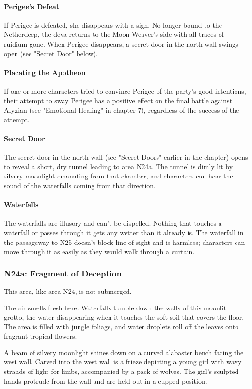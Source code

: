 \documentclass[10pt,a4paper,twoside,twocolumn,openany,nodeprecatedcode]{dndbook}
\begin{document}
\paragraph{Perigee's Defeat}
If Perigee is defeated, she disappears with a sigh. No longer bound to the Netherdeep, the deva returns to the Moon Weaver's side with all traces of ruidium gone. When Perigee disappears, a secret door in the north wall swings open (see "Secret Door" below).

\paragraph{Placating the Apotheon}
If one or more characters tried to convince Perigee of the party's good intentions, their attempt to sway Perigee has a positive effect on the final battle against Alyxian (see "Emotional Healing" in chapter 7), regardless of the success of the attempt.

\paragraph{Secret Door}
The secret door in the north wall (see "Secret Doors" earlier in the chapter) opens to reveal a short, dry tunnel leading to area N24a. The tunnel is dimly lit by silvery moonlight emanating from that chamber, and characters can hear the sound of the waterfalls coming from that direction.

\paragraph{Waterfalls}
The waterfalls are illusory and can't be dispelled. Nothing that touches a waterfall or passes through it gets any wetter than it already is. The waterfall in the passageway to N25 doesn't block line of sight and is harmless; characters can move through it as easily as they would walk through a curtain.

\subsubsection{N24a: Fragment of Deception}
This area, like area N24, is not submerged.

\begin{DndReadAloud}{}
The air smells fresh here. Waterfalls tumble down the walls of this moonlit grotto, the water disappearing when it touches the soft soil that covers the floor. The area is filled with jungle foliage, and water droplets roll off the leaves onto fragrant tropical flowers.

A beam of silvery moonlight shines down on a curved alabaster bench facing the west wall. Carved into the west wall is a frieze depicting a young girl with wavy strands of light for limbs, accompanied by a pack of wolves. The girl's sculpted hands protrude from the wall and are held out in a cupped position.

\end{DndReadAloud}
\end{document}
